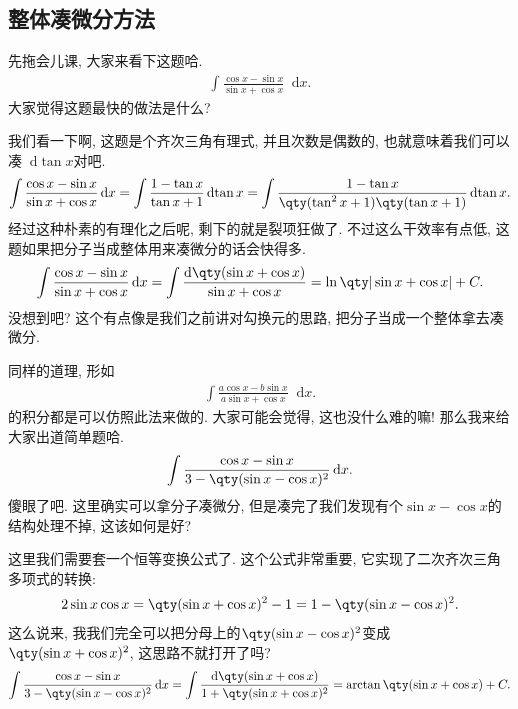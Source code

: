 \documentclass{ctexbook}
\newcommand*{\dif}{\mathop{}\!\mathrm{d}}
\begin{document}
{\subsection{整体凑微分方法}
先拖会儿课, 大家来看下这题哈. 
\begin{align*}
\int\frac{\cos{x}-\sin{x}}{\sin{x}+\cos{x}}\dif{x}
.\end{align*}
大家觉得这题最快的做法是什么? \par
我们看一下啊, 这题是个齐次三角有理式, 并且次数是偶数的, 也就意味着我们可以凑$\dif{\tan{x}}$对吧. 
\begin{align*}
\int\frac{\cos{x}-\sin{x}}{\sin{x}+\cos{x}}\dif{x}=\int\frac{1-\tan{x}}{\tan{x}+1}\dif{\tan{x}}=\int\frac{1-\tan{x}}{\qty(\tan^{2}{x}+1)\qty(\tan{x}+1)}\dif{\tan{x}}
.\end{align*}
经过这种朴素的有理化之后呢, 剩下的就是裂项狂做了. 不过这么干效率有点低, 这题如果把分子当成整体用来凑微分的话会快得多. 
\begin{align*}
\int\frac{\cos{x}-\sin{x}}{\sin{x}+\cos{x}}\dif{x}=\int\frac{\dif{\qty(\sin{x}+\cos{x})}}{\sin{x}+\cos{x}}=\ln\qty|\sin{x}+\cos{x}|+C
.\end{align*}
没想到吧? 这个有点像是我们之前讲对勾换元的思路, 把分子当成一个整体拿去凑微分. \par
同样的道理, 形如
\begin{align*}
\int\frac{a\cos{x}-b\sin{x}}{a\sin{x}+\cos{x}}\dif{x}
.\end{align*}
的积分都是可以仿照此法来做的. 大家可能会觉得, 这也没什么难的嘛! 那么我来给大家出道简单题哈. 
\begin{align*}
\int\frac{\cos{x}-\sin{x}}{3-\qty(\sin{x}-\cos{x})^{2}}\dif{x}
.\end{align*}
傻眼了吧. 这里确实可以拿分子凑微分, 但是凑完了我们发现有个$\sin{x}-\cos{x}$的结构处理不掉, 这该如何是好? \par
这里我们需要套一个恒等变换公式了. 这个公式非常重要, 它实现了二次齐次三角多项式的转换: 
\begin{align*}
2\sin{x}\cos{x}=\qty(\sin{x}+\cos{x})^{2}-1=1-\qty(\sin{x}-\cos{x})^{2}
.\end{align*}
这么说来, 我我们完全可以把分母上的$\qty(\sin{x}-\cos{x})^{2}$变成$\qty(\sin{x}+\cos{x})^{2}$, 这思路不就打开了吗? 
\begin{align*}
\int\frac{\cos{x}-\sin{x}}{3-\qty(\sin{x}-\cos{x})^{2}}\dif{x}=\int\frac{\dif{\qty(\sin{x}+\cos{x})}}{1+\qty(\sin{x}+\cos{x})^{2}}=\arctan{\qty(\sin{x}+\cos{x})}+C
.\end{align*}\par
}
\end{document}
